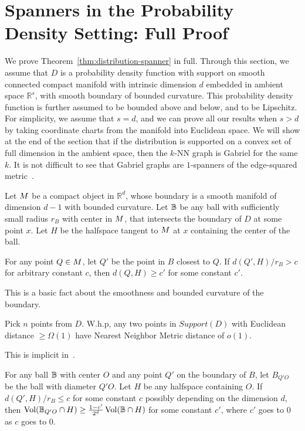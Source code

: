 \section{Spanners in the Probability Density Setting: Full
  Proof}\label{ap:distribution-spanner}

We prove Theorem~\ref{thm:distribution-spanner} in full.
Through this section, we assume that $D$ is a probability density
function with support on smooth connected compact manifold with intrinsic dimension
$d$ embedded in ambient space $\mathbb{R}^s$, 
with smooth boundary of bounded curvature. This
probability density function is further assumed to be bounded
above and below, and to be Lipschitz. For simplicity, we assume that
$s=d$, and we can prove all our results when $s > d$ by taking
coordinate charts from the manifold into Euclidean space.  We
will show at the end of the section that if the distribution is
supported on a convex set of full dimension in the ambient space,
then the $k$-NN graph is Gabriel for the same $k$. It is not
difficult to see that Gabriel graphs are $1$-spanners of the
edge-squared metric~\cite{SridharMaster}.

\begin{lemma}
  Let $M$ be a compact object in $\mathbb{R}^d$, whose
  boundary is a smooth manifold of dimension $d-1$ with bounded
  curvature.
  Let $\mathbb{B}$ be any ball with sufficiently small radius
  $r_B$ with center in $M$, that intersects the boundary of $D$
  at some point $x$.
  Let $H$ be the halfspace tangent to $M$ at $x$ containing the center
  of the ball.

For any point $Q \in M$, let $Q'$ be the point in $B$
closest to $Q$. If $d(Q', H) / r_B > c$ for arbitrary constant $c$,
then $d(Q, H) \geq c'$ for some constant $c'$.
\end{lemma}

This is a basic fact about the smoothness and bounded curvature
of the boundary.

\begin{lemma} Pick $n$ points from $D$. W.h.p, any two points in
  $Support(D)$ with Euclidean distance $ \geq \Omega(1)$ 
  have Nearest Neighbor Metric distance of $o(1)$.
\end{lemma}

This is implicit in~\cite{hwang2016}.
\begin{lemma} For any ball $\mathbb{B}$ with center $O$ and any point $Q'$ on the
  boundary of $B$, let $B_{Q'O}$ be the ball with diameter $Q'O$.
  Let $H$ be any halfspace containing $O$.
  If $d(Q', H) / r_B \leq c$ for some constant
  $c$ possibly depending on the dimension $d$, then
  $\operatorname{Vol}(\mathbb{B}_{Q'O} \cap H) \geq \frac{1-c'}{2^d} \operatorname{Vol}(\mathbb{B} \cap H)$
  for some
  constant $c'$, where $c'$ goes to $0$ as $c$ goes to $0$.
\end{lemma}

